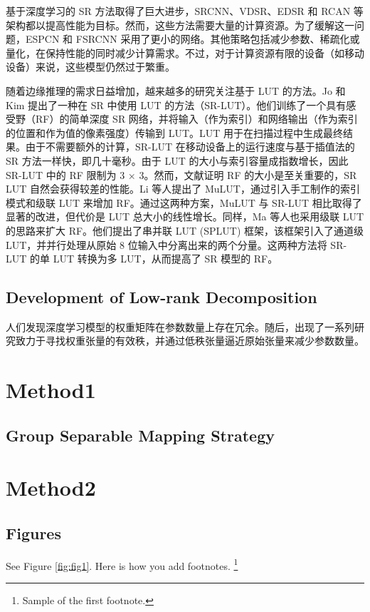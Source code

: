 \documentclass[a4paper]{article}
\begin{document}
基于深度学习的 SR 方法取得了巨大进步，SRCNN、VDSR、EDSR 和 RCAN 等架构都以提高性能为目标。然而，这些方法需要大量的计算资源。为了缓解这一问题，ESPCN 和 FSRCNN 采用了更小的网络。其他策略包括减少参数、稀疏化或量化，在保持性能的同时减少计算需求。不过，对于计算资源有限的设备（如移动设备）来说，这些模型仍然过于繁重。

随着边缘推理的需求日益增加，越来越多的研究关注基于 LUT 的方法。Jo 和 Kim 提出了一种在 SR 中使用 LUT 的方法（SR-LUT）\cite{jo2021practical}。他们训练了一个具有感受野（RF）的简单深度 SR 网络，并将输入（作为索引）和网络输出（作为索引的位置和作为值的像素强度）传输到 LUT。LUT 用于在扫描过程中生成最终结果。由于不需要额外的计算，SR-LUT 在移动设备上的运行速度与基于插值法的 SR 方法一样快，即几十毫秒。由于 LUT 的大小与索引容量成指数增长，因此 SR-LUT 中的 RF 限制为 3 × 3。然而，文献证明 RF 的大小是至关重要的，SR LUT 自然会获得较差的性能。Li 等人提出了 MuLUT，通过引入手工制作的索引模式和级联 LUT 来增加 RF。通过这两种方案，MuLUT 与 SR-LUT 相比取得了显著的改进，但代价是 LUT 总大小的线性增长。同样，Ma 等人也采用级联 LUT 的思路来扩大 RF。他们提出了串并联 LUT (SPLUT) 框架，该框架引入了通道级 LUT，并并行处理从原始 8 位输入中分离出来的两个分量。这两种方法将 SR-LUT 的单 LUT 转换为多 LUT，从而提高了 SR 模型的 RF。


\subsection{Development of Low-rank Decomposition}
人们发现深度学习模型的权重矩阵在参数数量上存在冗余。随后，出现了一系列研究致力于寻找权重张量的有效秩，并通过低秩张量逼近原始张量来减少参数数量。


\section{Method1}
\subsection{Group Separable Mapping Strategy}

\section{Method2}
\subsection{Figures}
See Figure \ref{fig:fig1}. Here is how you add footnotes. \footnote{Sample of the first footnote.}
\lipsum[11] 
\end{document}
